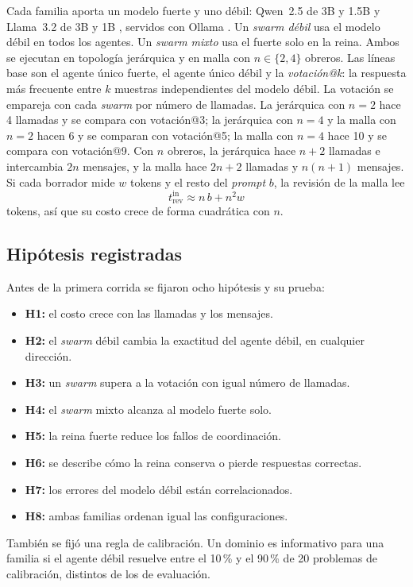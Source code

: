 \documentclass[conference]{IEEEtran}
\begin{document}
Cada familia aporta un modelo fuerte y uno débil: Qwen~2.5 de 3B y 1.5B \cite{qwen2025} y Llama~3.2 de 3B y 1B \cite{llama2024}, servidos con Ollama \cite{ollama}. Un \textit{swarm débil} usa el modelo débil en todos los agentes. Un \textit{swarm mixto} usa el fuerte solo en la reina. Ambos se ejecutan en topología jerárquica y en malla con $n\in\{2,4\}$ obreros. Las líneas base son el agente único fuerte, el agente único débil y la \textit{votación@k}: la respuesta más frecuente entre $k$ muestras independientes del modelo débil. La votación se empareja con cada \textit{swarm} por número de llamadas. La jerárquica con $n=2$ hace 4 llamadas y se compara con votación@3; la jerárquica con $n=4$ y la malla con $n=2$ hacen 6 y se comparan con votación@5; la malla con $n=4$ hace 10 y se compara con votación@9. Con $n$ obreros, la jerárquica hace $n+2$ llamadas e intercambia $2n$ mensajes, y la malla hace $2n+2$ llamadas y $n(n+1)$ mensajes. Si cada borrador mide $w$ tokens y el resto del \textit{prompt} $b$, la revisión de la malla lee
\begin{equation}
t^{\text{in}}_{\text{rev}}\approx n\,b+n^2 w
\label{eq:rev}
\end{equation}
tokens, así que su costo crece de forma cuadrática con $n$.

\subsection{Hipótesis registradas}

Antes de la primera corrida se fijaron ocho hipótesis y su prueba:
\begin{itemize}
\item \textbf{H1:} el costo crece con las llamadas y los mensajes.
\item \textbf{H2:} el \textit{swarm} débil cambia la exactitud del agente débil, en cualquier dirección.
\item \textbf{H3:} un \textit{swarm} supera a la votación con igual número de llamadas.
\item \textbf{H4:} el \textit{swarm} mixto alcanza al modelo fuerte solo.
\item \textbf{H5:} la reina fuerte reduce los fallos de coordinación.
\item \textbf{H6:} se describe cómo la reina conserva o pierde respuestas correctas.
\item \textbf{H7:} los errores del modelo débil están correlacionados.
\item \textbf{H8:} ambas familias ordenan igual las configuraciones.
\end{itemize}
También se fijó una regla de calibración. Un dominio es informativo para una familia si el agente débil resuelve entre el 10\,\% y el 90\,\% de 20 problemas de calibración, distintos de los de evaluación.
\end{document}
